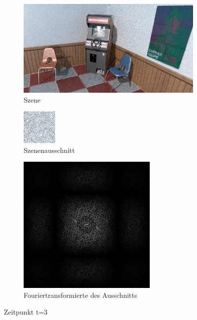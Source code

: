 \begin{figure}[H]
    \begin{subfigure}{\textwidth}
        \centering \includegraphics[scale=.25]{content/TemporalerAlg/Bilder/Sorting/Screenshots/seed_debug_5.0_selection.png}
        \caption{Szene}
        \label{fig:Nur_Sorting_Szene_t3}
    \end{subfigure}
    \begin{subfigure}{0.5\textwidth}
        \centering\includegraphics[width=0.4\linewidth]{content/TemporalerAlg/Bilder/Sorting/Screenshots/seed_debug_5.0_ausschnitt.png} 
        \caption{Szenenausschnitt}
        \label{fig:Nur_Sorting_ausschnitt_t3}
    \end{subfigure}
    \begin{subfigure}{0.5\textwidth}
        \centering\includegraphics[width=0.4\linewidth]{content/TemporalerAlg/Bilder/Sorting/Screenshots/Spektren/seed_debug_5.0_ausschnitt.png}
        \caption{Fouriertransformierte des Ausschnitts}
        \label{fig:Nur_Sorting_Fouriertransformierte_t3}
    \end{subfigure}
        \caption{Zeitpunkt t=3}
        \label{fig:Nur_Sorting_Verlauf_t3}
\end{figure}

